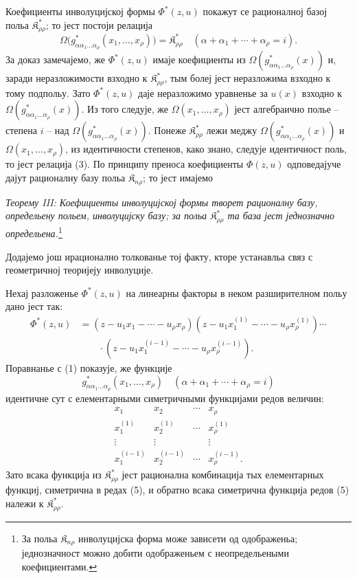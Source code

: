 ﻿\documentclass[11pt]{article}
\providecommand{\Kfield}{\mathfrak{K}}
\begin{document}
Коефициенты инволуцијској формы $\Phi^*(z,u)$ покажут се рационалној базој польа $\Kfield^*_{\rho\rho}$; то јест постоји релација
\begin{equation}
  \Omega\bigl(g^*_{\alpha\alpha_1\ldots\alpha_\rho}(x_1,
  \ldots,x_\rho)\bigr)=\Kfield^*_{\rho\rho}
  \quad(\alpha+\alpha_1+\cdots+\alpha_\rho=i).
\tag{3}
\end{equation}
За доказ замечајемо, же $\Phi^*(z,u)$ имаје коефициенты из $\Omega(g^*_{\alpha\alpha_1\ldots\alpha_\rho}(x))$ и, заради неразложимости взходно к $\Kfield^*_{\rho\rho}$, тым болеј јест неразложима взходно к тому подпольу. Зато $\Phi^*(z,u)$ даје неразложимо уравненье за $u(x)$ взходно к $\Omega(g^*_{\alpha\alpha_1\ldots\alpha_\rho}(x))$. Из того следује, же $\Omega(x_1,\ldots,x_\rho)$ јест алгебраично полье -- степена $i$ -- над $\Omega(g^*_{\alpha\alpha_1\ldots\alpha_\rho}(x))$. Понеже $\Kfield^*_{\rho\rho}$ лежи меджу $\Omega(g^*_{\alpha\alpha_1\ldots\alpha_\rho}(x))$ и $\Omega(x_1,\ldots,x_\rho)$, из идентичности степенов, како знано, следује идентичност поль, то јест релација (3). По принципу преноса коефициенты $\Phi(z,u)$ одповедајуче дајут рационалну базу польа $\Kfield_{n\rho}$; то јест имајемо

{\itshape Теорему III: Коефициенты инволуцијској формы творет рационалну базу, определьену польем, инволуцијску базу; за польа $\Kfield^*_{\rho\rho}$ та база јест једнозначно определьена.}\footnote{За польа $\Kfield_{n\rho}$ инволуцијска форма може зависети од одображеньа; једнозначност можно добити одображеньем с неопредельеными коефициентами.}

Додајемо још ирационално толкованье тој факту, кторе устанавльа связ с геометричној теоријеју инволуције.

Нехај разложенье $\Phi^*(z,u)$ на линеарны факторы в неком разширителном польу дано јест так:
\begin{equation}
\begin{aligned}
 \Phi^*(z,u)&=(z-u_1x_1-\cdots-u_\rho x_\rho)
 (z-u_1x_1^{(1)}-\cdots-u_\rho x_\rho^{(1)})\cdots\\
 &\qquad\cdot
 (z-u_1x_1^{(i-1)}-\cdots-u_\rho x_\rho^{(i-1)}).
\end{aligned}
\tag{4}
\end{equation}
Поравнанье с (1) показује, же функције
\[
  g^*_{\alpha\alpha_1\ldots\alpha_\rho}(x_1,
  \ldots,x_\rho)\quad(\alpha+\alpha_1+\cdots+\alpha_\rho=i)
\]
идентичне сут с елементарными симетричными функцијами редов величин:
\begin{equation}
\begin{array}{cccc}
  x_1 & x_2 & \cdots & x_\rho\\
  x_1^{(1)} & x_2^{(1)} & \cdots & x_\rho^{(1)}\\
  \vdots & \vdots & & \vdots\\
  x_1^{(i-1)} & x_2^{(i-1)} & \cdots & x_\rho^{(i-1)}.
\end{array}
\tag{5}
\end{equation}
Зато всака функција из $\Kfield^*_{\rho\rho}$ јест рационална комбинација тых елементарных функциј, симетрична в редах (5), и обратно всака симетрична функција редов (5) належи к $\Kfield^*_{\rho\rho}$.
\end{document}
